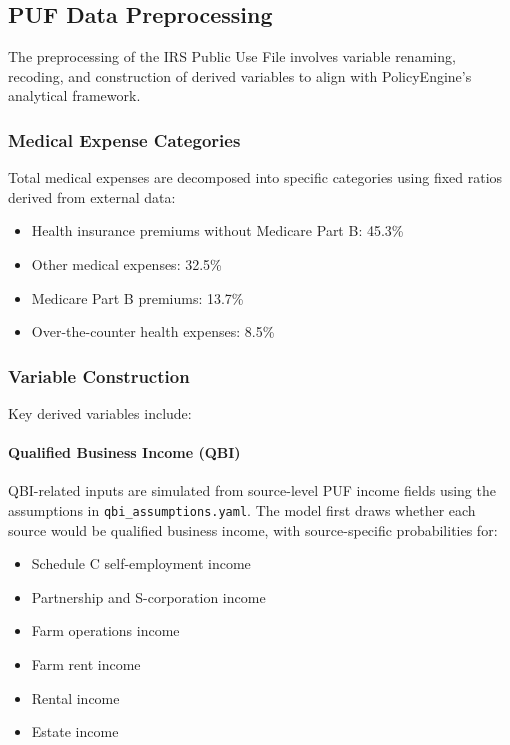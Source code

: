 \subsection{PUF Data Preprocessing}

The preprocessing of the IRS Public Use File involves variable renaming, recoding, and construction of derived variables to align with PolicyEngine's analytical framework.

\subsubsection{Medical Expense Categories}

Total medical expenses are decomposed into specific categories using fixed ratios derived from external data:

\begin{itemize}
    \item Health insurance premiums without Medicare Part B: 45.3\%
    \item Other medical expenses: 32.5\%
    \item Medicare Part B premiums: 13.7\%
    \item Over-the-counter health expenses: 8.5\%
\end{itemize}

\subsubsection{Variable Construction}

Key derived variables include:

\paragraph{Qualified Business Income (QBI)}
QBI-related inputs are simulated from source-level PUF income fields using the assumptions in \texttt{qbi\_assumptions.yaml}. The model first draws whether each source would be qualified business income, with source-specific probabilities for:
\begin{itemize}
    \item Schedule C self-employment income
    \item Partnership and S-corporation income
    \item Farm operations income
    \item Farm rent income
    \item Rental income
    \item Estate income
\end{itemize}

